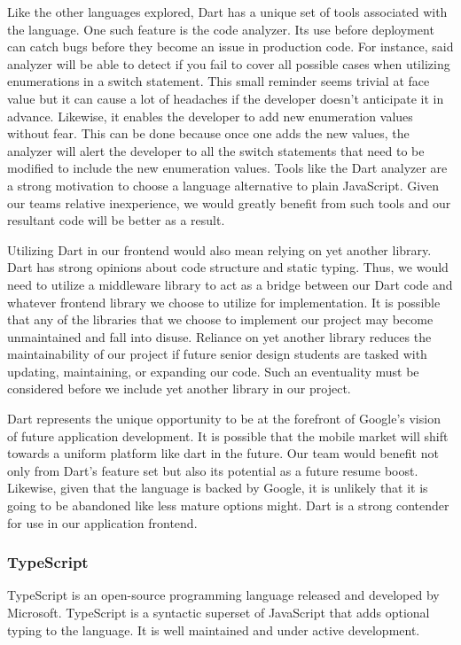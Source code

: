 \documentclass[12pt]{report}
\begin{document}
Like the other languages explored, Dart has a unique set of tools associated with the language. One such feature is the code analyzer. Its use before deployment can catch bugs before they become an issue in production code. For instance, said analyzer will be able to detect if you fail to cover all possible cases when utilizing enumerations in a switch statement. This small reminder seems trivial at face value but it can cause a lot of headaches if the developer doesn't anticipate it in advance. Likewise, it enables the developer to add new enumeration values without fear. This can be done because once one adds the new values, the analyzer will alert the developer to all the switch statements that need to be modified to include the new enumeration values. Tools like the Dart analyzer are a strong motivation to choose a language alternative to plain JavaScript. Given our teams relative inexperience, we would greatly benefit from such tools and our resultant code will be better as a result.

Utilizing Dart in our frontend would also mean relying on yet another library. Dart has strong opinions about code structure and static typing. Thus, we would need to utilize a middleware library to act as a bridge between our Dart code and whatever frontend library we choose to utilize for implementation. It is possible that any of the libraries that we choose to implement our project may become unmaintained and fall into disuse. Reliance on yet another library reduces the maintainability of our project if future senior design students are tasked with updating, maintaining, or expanding our code. Such an eventuality must be considered before we include yet another library in our project.

Dart represents the unique opportunity to be at the forefront of Google's vision of future application development. It is possible that the mobile market will shift towards a uniform platform like dart in the future. Our team would benefit not only from Dart's feature set but also its potential as a future resume boost. Likewise, given that the language is backed by Google, it is unlikely that it is going to be abandoned like less mature options might. Dart is a strong contender for use in our application frontend.

\subsubsection*{TypeScript}

TypeScript is an open-source programming language released and developed by Microsoft. TypeScript is a syntactic superset of JavaScript that adds optional typing to the language.\cite{typescripthomepage} It is well maintained and under active development.
\end{document}
